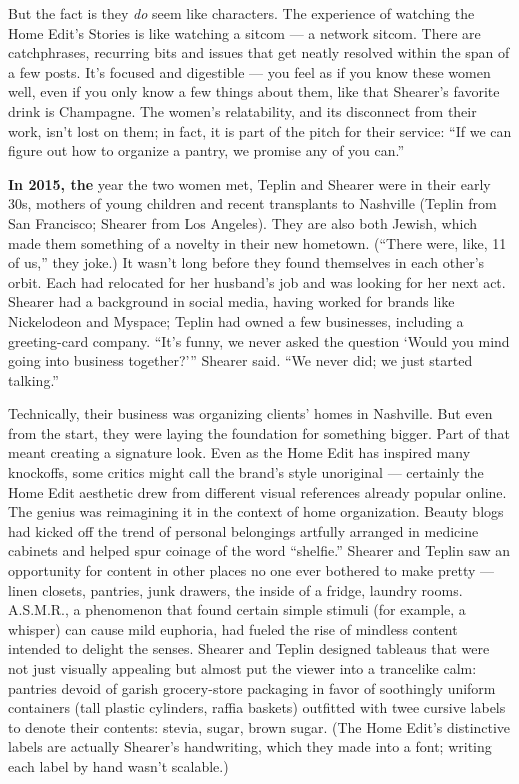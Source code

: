 But the fact is they \emph{do} seem like characters. The experience of
watching the Home Edit's Stories is like watching a sitcom --- a network
sitcom. There are catchphrases, recurring bits and issues that get
neatly resolved within the span of a few posts. It's focused and
digestible --- you feel as if you know these women well, even if you
only know a few things about them, like that Shearer's favorite drink is
Champagne. The women's relatability, and its disconnect from their work,
isn't lost on them; in fact, it is part of the pitch for their service:
``If we can figure out how to organize a pantry, we promise any of you
can.''

\textbf{In 2015, the} year the two women met, Teplin and Shearer were in
their early 30s, mothers of young children and recent transplants to
Nashville (Teplin from San Francisco; Shearer from Los Angeles). They
are also both Jewish, which made them something of a novelty in their
new hometown. (``There were, like, 11 of us,'' they joke.) It wasn't
long before they found themselves in each other's orbit. Each had
relocated for her husband's job and was looking for her next act.
Shearer had a background in social media, having worked for brands like
Nickelodeon and Myspace; Teplin had owned a few businesses, including a
greeting-card company. ``It's funny, we never asked the question `Would
you mind going into business together?''' Shearer said. ``We never did;
we just started talking.''

Technically, their business was organizing clients' homes in Nashville.
But even from the start, they were laying the foundation for something
bigger. Part of that meant creating a signature look. Even as the Home
Edit has inspired many knockoffs, some critics might call the brand's
style unoriginal --- certainly the Home Edit aesthetic drew from
different visual references already popular online. The genius was
reimagining it in the context of home organization. Beauty blogs had
kicked off the trend of personal belongings artfully arranged in
medicine cabinets and helped spur coinage of the word ``shelfie.''
Shearer and Teplin saw an opportunity for content in other places no one
ever bothered to make pretty --- linen closets, pantries, junk drawers,
the inside of a fridge, laundry rooms. A.S.M.R., a phenomenon that found
certain simple stimuli (for example, a whisper) can cause mild euphoria,
had fueled the rise of mindless content intended to delight the senses.
Shearer and Teplin designed tableaus that were not just visually
appealing but almost put the viewer into a trancelike calm: pantries
devoid of garish grocery-store packaging in favor of soothingly uniform
containers (tall plastic cylinders, raffia baskets) outfitted with twee
cursive labels to denote their contents: stevia, sugar, brown sugar.
(The Home Edit's distinctive labels are actually Shearer's handwriting,
which they made into a font; writing each label by hand wasn't
scalable.)

